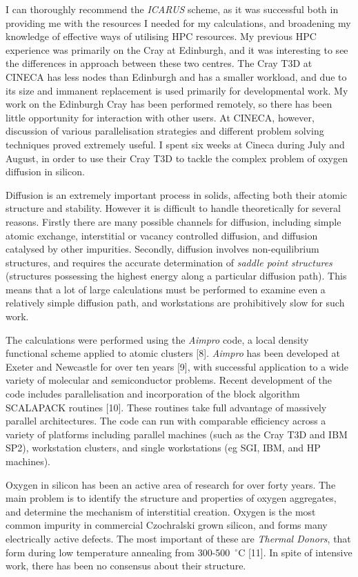 {I can thoroughly recommend the {\it ICARUS} scheme, as it was
successful both in providing me with the resources I needed for my
calculations, and broadening my knowledge of effective ways of
utilising HPC resources. My previous HPC experience was primarily on
the Cray at Edinburgh, and it was interesting to see the differences
in approach between these two centres.  The Cray T3D at CINECA has
less nodes than Edinburgh and has a smaller workload, and due to its
size and immanent replacement is used primarily for developmental
work.  My work on the Edinburgh Cray has been performed remotely, so
there has been little opportunity for interaction with other users.
At CINECA, however, discussion of various parallelisation strategies
and different problem solving techniques proved extremely useful. I
spent six weeks at Cineca during July and August, in order to use
their Cray T3D to tackle the complex problem of oxygen diffusion in
silicon.

Diffusion is an extremely important process in solids, affecting both
their atomic structure and stability.  However it is difficult to
handle theoretically for several reasons.  Firstly there are many
possible channels for diffusion, including simple atomic exchange,
interstitial or vacancy controlled diffusion, and diffusion catalysed
by other impurities.  Secondly, diffusion involves non-equilibrium
structures, and requires the accurate determination of {\it saddle
point structures} (structures possessing the highest energy along a
particular diffusion path).  This means that a lot of large
calculations must be performed to examine even a relatively simple
diffusion path, and workstations are prohibitively slow for such work.

The calculations were performed using the {\it Aimpro} code, a local
density functional scheme applied to atomic clusters [8].  {\it
Aimpro} has been developed at Exeter and Newcastle for over ten years
[9], with successful application to a wide variety of molecular and
semiconductor problems.  Recent development of the code includes
parallelisation and incorporation of the block algorithm SCALAPACK
routines [10]. These routines take full advantage of massively parallel
architectures.  The code can run with comparable efficiency across a
variety of platforms including parallel machines (such as the Cray T3D
and IBM SP2), workstation clusters, and single workstations (eg SGI,
IBM, and HP machines).

Oxygen in silicon has been an active area of research for over forty
years.  The main problem is to identify the structure and properties
of oxygen aggregates, and determine the mechanism of interstitial
creation.  Oxygen is the most common impurity in commercial
Czochralski grown silicon, and forms many electrically active defects.
The most important of these are {\it Thermal Donors}, that form during
low temperature annealing from 300-500~$^\circ$C [11].  In spite of
intensive work, there has been no consensus about their structure.

}
